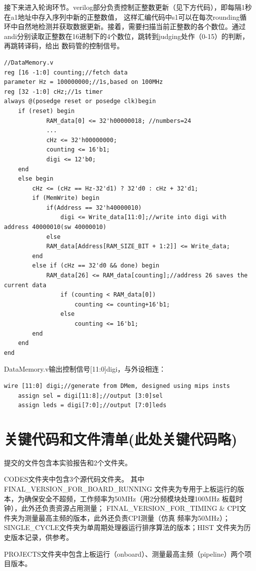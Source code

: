 \documentclass[10pt]{article}
\begin{document}
接下来进入轮询环节。verilog部分负责控制正整数更新（见下方代码），即每隔1秒在a1地址中存入序列中新的正整数值，
这样汇编代码中s1可以在每次rounding循环中自然地检测并获取数据更新。接着，需要扫描当前正整数的各个数位。通过
andi分别读取正整数在16进制下的4个数位，跳转到judging处作（0-15）的判断，再跳转译码，给出
数码管的控制信号。

\begin{lstlisting}[style={verilog-style}]
//DataMemory.v
reg [16 -1:0] counting;//fetch data
parameter Hz = 100000000;//1s,based on 100MHz
reg [32 -1:0] cHz;//1s timer
always @(posedge reset or posedge clk)begin
	if (reset) begin
            RAM_data[0] <= 32'h00000018; //numbers=24
            ...
            cHz <= 32'h00000000;
            counting <= 16'b1;
            digi <= 12'b0;
	end
	else begin
	    cHz <= (cHz == Hz-32'd1) ? 32'd0 : cHz + 32'd1;
	    if (MemWrite) begin
	        if(Address == 32'h40000010)
		        digi <= Write_data[11:0];//write into digi with address 40000010(sw 40000010)
		    else
			RAM_data[Address[RAM_SIZE_BIT + 1:2]] <= Write_data;
	    end
	    else if (cHz == 32'd0 && done) begin
		    RAM_data[26] <= RAM_data[counting];//address 26 saves the current data
                if (counting < RAM_data[0])
                    counting <= counting+16'b1;
                else
                    counting <= 16'b1;
	    end
	end
end
\end{lstlisting}

DataMemory.v输出控制信号[11:0]digi，与外设相连：
\begin{lstlisting}[style = {verilog-style}]
    wire [11:0] digi;//generate from DMem, designed using mips insts
    assign sel = digi[11:8];//output [3:0]sel
    assign leds = digi[7:0];//output [7:0]leds
\end{lstlisting}
\section{关键代码和文件清单(此处关键代码略)}
提交的文件包含本实验报告和2个文件夹。

CODES文件夹中包含3个源代码文件夹。
其中FINAL\_VERSION\_FOR\_BOARD\_RUNNING
文件夹为专用于上板运行的版本，为确保安全不超频，工作频率为50MHz（用2分频模块处理100MHz
板载时钟），此外还负责资源占用测量；
FINAL\_VERSION\_FOR\_TIMING \& CPI文件夹为测量最高主频的版本，此外还负责CPI测量（仿真
频率为50MHz）；SINGLE\_CYCLE文件夹为单周期处理器运行排序算法的版本；HIST
文件夹为历史版本记录，供参考。

PROJECTS文件夹中包含上板运行（onboard）、测量最高主频（pipeline）两个项目版本。
\end{document}
